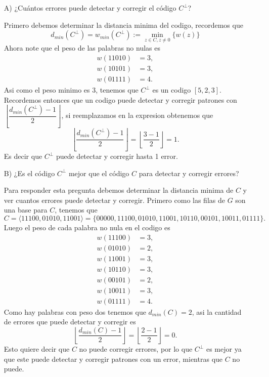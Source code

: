 \begin{itemize}
    \item[A)] ¿Cuántos errores puede detectar y corregir el código $C^\perp$?
    \begin{sols}
        Primero debemos determinar la distancia minima del codigo, recordemos que 
        $$d_{min}(C^\perp)=w_{min}(C^\perp):=\min_{z\in C, z\neq 0}\{w(z)\}$$
        Ahora note que el peso de las palabras no nulas es
        \begin{align*}
            w(11010)&=3,\\
            w(10101)&=3,\\
            w(01111)&=4.
        \end{align*}
        Asi como el peso minimo es $3$, tenemos que $C^\perp$ es un codigo $[5,2,3]$. Recordemos entonces que un codigo puede detectar y corregir patrones con $\left\lfloor\dfrac{d_{min}(C^\perp)-1}{2}\right\rfloor$, si reemplazamos en la expresion obtenemos que
        $$\left\lfloor\dfrac{d_{min}(C^\perp)-1}{2}\right\rfloor=\left\lfloor\dfrac{3-1}{2}\right\rfloor=1.$$
        Es decir que $C^\perp$ puede detectar y corregir hasta 1 error.
    \end{sols}
    \item[B)] ¿Es el código $C^\perp$ mejor que el código $C$ para detectar y corregir errores?
    \begin{sols}
        Para responder esta pregunta debemos determinar la distancia minima de $C$ y ver cuantos errores puede detectar y corregir. Primero como las filas de $G$ son una base para $C$, tenemos que
        $$C=\langle 11100,01010,11001\rangle=\{00000,11100,01010,11001,10110,00101,10011,01111\}.$$
        Luego el peso de cada palabra no nula en el codigo es
        \begin{align*}
            w(11100)&=3,\\w(01010)&=2,\\w(11001)&=3,\\w(10110)&=3,\\w(00101)&=2,\\w(10011)&=3,\\w(01111)&=4.
        \end{align*}
        Como hay palabras con peso dos tenemos que $d_{min}(C)=2$, asi la cantidad de errores que puede detectar y corregir es
         $$\left\lfloor\dfrac{d_{min}(C)-1}{2}\right\rfloor=\left\lfloor\dfrac{2-1}{2}\right\rfloor=0.$$
         Esto quiere decir que $C$ no puede corregir errores, por lo que $C^\perp$ es mejor ya que este puede detectar y corregir patrones con un error, mientras que $C$ no puede.


\end{sols}
\end{itemize}
